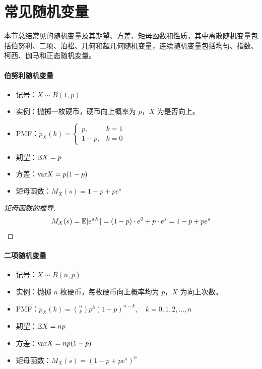 \section{常见随机变量}
\label{sec:random-variables}

本节总结常见的随机变量及其期望、方差、矩母函数和性质，其中离散随机变量包括伯努利、二项、泊松、几何和超几何随机变量，连续随机变量包括均匀、指数、柯西、伽马和正态随机变量。


\paragraph{伯努利随机变量}

\begin{itemize}[itemsep=1ex]
    \item 记号：$X\sim B(1,p)$
    \item 实例：抛掷一枚硬币，硬币向上概率为 $p$，$X$ 为是否向上。
    \item PMF：$p_X(k)=\begin{cases}p,&k=1\\1-p,&k=0\end{cases}$
    \item 期望：$\mathbb{E} X=p$
    \item 方差：$\mathrm{var} X=p(1-p)$
    \item 矩母函数：$M_X(s)=1-p+pe^s$
\end{itemize}

\begin{proof}[矩母函数的推导]
\[
M_X(s)=\mathbb{E}[e^{sX}]=(1-p)\cdot e^{0}+p\cdot e^{s}=1-p+pe^s
\]
\end{proof}

\paragraph{二项随机变量}

\begin{itemize}[itemsep=1ex]
    \item 记号：$X\sim B(n,p)$
    \item 实例：抛掷 $n$ 枚硬币，每枚硬币向上概率均为 $p$，$X$ 为向上次数。
    \item PMF：$p_X(k)=\displaystyle\binom{n}{k}p^k(1-p)^{n-k},\quad k=0,1,2,\ldots,n$
    \item 期望：$\mathbb{E} X=np$
    \item 方差：$\mathrm{var} X=np(1-p)$
    \item 矩母函数：$M_X(s)=(1-p+pe^s)^n$
\end{itemize}

